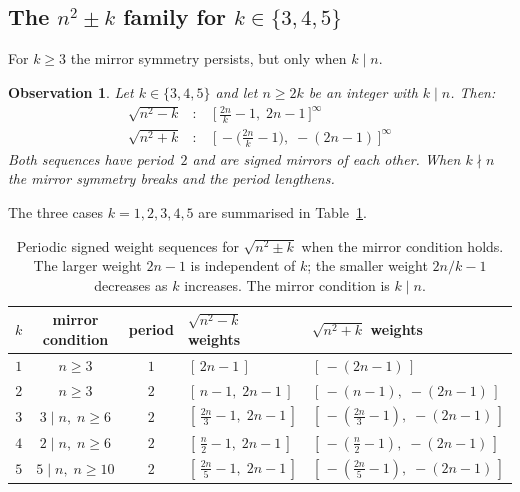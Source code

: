 \documentclass[12pt]{article}
\theoremstyle{definition}
\theoremstyle{remark}
\theoremstyle{plain}
\newtheorem{observation}[theorem]{Observation}
\begin{document}
\subsection*{The \texorpdfstring{$n^2 \pm k$}{n^2 pm k} family for \texorpdfstring{$k \in \{3,4,5\}$}{k = 3, 4, 5}}

For $k \geq 3$ the mirror symmetry persists, but only when $k \mid n$.

\begin{observation}
\label{obs:sqrt-n2-pm-k}
Let $k \in \{3, 4, 5\}$ and let $n \geq 2k$ be an integer with $k \mid n$.  Then:
\begin{align*}
\sqrt{n^2 - k} &: \quad \bigl[\,\tfrac{2n}{k}-1,\; 2n-1\,\bigr]^\infty \\
\sqrt{n^2 + k} &: \quad \bigl[\,-\bigl(\tfrac{2n}{k}-1\bigr),\; -(2n-1)\,\bigr]^\infty
\end{align*}
Both sequences have period~$2$ and are signed mirrors of each other.
When $k \nmid n$ the mirror symmetry breaks and the period lengthens.
\end{observation}

The three cases $k=1,2,3,4,5$ are summarised in Table~\ref{tab:signed-weight-patterns}.

\begin{table}[h]
\centering
\begin{tabular}{@{}cccll@{}}
\toprule
$k$ & mirror condition & period & $\sqrt{n^2-k}$ weights & $\sqrt{n^2+k}$ weights \\
\midrule
$1$ & $n \geq 3$           & $1$ & $[\,2n-1\,]$                     & $[\,-(2n-1)\,]$ \\
$2$ & $n \geq 3$           & $2$ & $[\,n-1,\; 2n-1\,]$              & $[\,-(n-1),\; -(2n-1)\,]$ \\
$3$ & $3 \mid n,\; n \geq 6$  & $2$ & $[\,\tfrac{2n}{3}-1,\; 2n-1\,]$  & $[\,-(\tfrac{2n}{3}-1),\; -(2n-1)\,]$ \\
$4$ & $2 \mid n,\; n \geq 6$  & $2$ & $[\,\tfrac{n}{2}-1,\; 2n-1\,]$   & $[\,-(\tfrac{n}{2}-1),\; -(2n-1)\,]$ \\
$5$ & $5 \mid n,\; n \geq 10$ & $2$ & $[\,\tfrac{2n}{5}-1,\; 2n-1\,]$  & $[\,-(\tfrac{2n}{5}-1),\; -(2n-1)\,]$ \\
\bottomrule
\end{tabular}
\caption{Periodic signed weight sequences for $\sqrt{n^2 \pm k}$ when the mirror
condition holds.  The larger weight $2n-1$ is independent of $k$; the smaller weight
$2n/k - 1$ decreases as $k$ increases.  The mirror condition is $k \mid n$.}
\label{tab:signed-weight-patterns}
\end{table}
\end{document}
